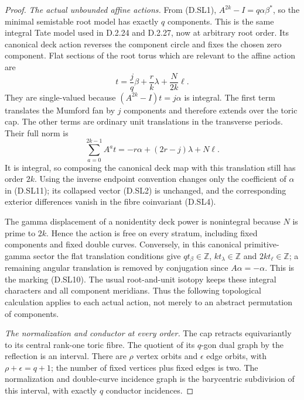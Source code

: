 \begin{proof}
\emph{The actual unbounded affine actions.}
From (D.SL1), $A^{2k}-I=q\alpha\beta^*$, so the
minimal semistable root model has exactly $q$ components.
This is the same integral Tate model used in D.2.24
and D.2.27, now at arbitrary root order. Its canonical
deck action reverses the component circle and fixes
the chosen zero component. Flat sections of the root
torus which are relevant to the affine action are
\[
                t=\frac{j}{q}\beta+\frac r k\lambda
                                      +\frac{N}{2k}\ell.
                                                               \tag{D.SL10}
\]
They are single-valued because
$(A^{2k}-I)t=j\alpha$ is integral. The first term
translates the Mumford fan by $j$ components and
therefore extends over the toric cap. The other
terms are ordinary unit translations in the
transverse periods. Their full norm is
\[
         \sum_{a=0}^{2k-1}A^a t
                     =-r\alpha+(2r-j)\lambda+N\ell.
                                                               \tag{D.SL11}
\]
It is integral, so composing the canonical deck
map with this translation still has order $2k$.
Using the inverse endpoint convention changes
only the coefficient of $\alpha$ in (D.SL11);
its collapsed vector (D.SL2) is unchanged, and
the corresponding exterior differences vanish
in the fibre coinvariant (D.SL4).

The gamma displacement of a nonidentity deck
power is nonintegral because $N$ is prime to
$2k$. Hence the action is free on every stratum,
including fixed components and fixed double
curves. Conversely, in this canonical primitive-
gamma sector the flat translation conditions
give $q t_\beta\in\mathbb Z$, $k t_\lambda\in\mathbb Z$
and $2k t_\ell\in\mathbb Z$; a remaining angular
translation is removed by conjugation since
$A\alpha=-\alpha$. This is the marking (D.SL10).
The usual root-and-unit isotopy keeps these
integral characters and all component meridians.
Thus the following topological calculation
applies to each actual action, not merely to
an abstract permutation of components.

\emph{The normalization and conductor at every order.}
The cap retracts equivariantly to its central
rank-one toric fibre. The quotient of its
$q$-gon dual graph by the reflection is an
interval. There are $\rho$ vertex orbits and
$\epsilon$ edge orbits, with
$\rho+\epsilon=q+1$; the number of fixed vertices
plus fixed edges is two. The normalization
and double-curve incidence graph is the
barycentric subdivision of this interval,
with exactly $q$ conductor incidences.


\end{proof}
